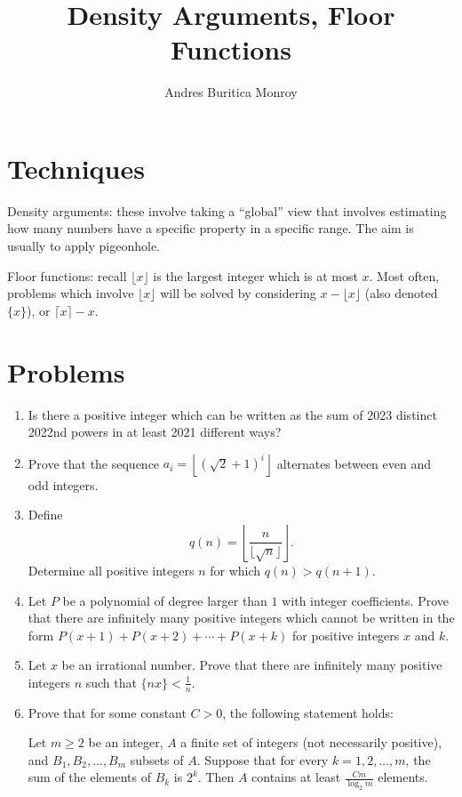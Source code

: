 \documentclass{article}
\title{Density Arguments, Floor Functions}
\author{Andres Buritica Monroy}
\date{}
\begin{document}
\maketitle
\section{Techniques}
  Density arguments: these involve taking a ``global'' view that involves
  estimating how many numbers have a specific property in a specific range.
  The aim is usually to apply pigeonhole.

  Floor functions: recall $\lfloor x\rfloor$ is the largest integer which is at
  most $x$. Most often, problems which involve $\lfloor x\rfloor$ will be
  solved by considering $x-\lfloor x\rfloor$ (also denoted $\{x\}$), or $\lceil
  x\rceil-x$.
\section{Problems}
\begin{enumerate}
  \item Is there a positive integer which can be written as the sum of 2023
    distinct 2022nd powers in at least 2021 different ways?
  \item Prove that the sequence $a_i=\left\lfloor(\sqrt 2+1)^i\right\rfloor$
    alternates between even and odd integers.
  \item Define
    \[q(n)=\left\lfloor\frac n{\lfloor\sqrt n\rfloor}\right\rfloor.\]
    Determine all positive integers $n$ for which $q(n)>q(n+1)$.
  \item Let $P$ be a polynomial of degree larger than $1$ with integer
    coefficients. Prove that there are infinitely many positive integers which cannot be
    written in the form $P(x+1)+P(x+2)+\cdots+P(x+k)$ for positive integers $x$
    and $k$.
  \item Let $x$ be an irrational number. Prove that there are infinitely many
    positive integers $n$ such that $\{nx\}<\frac 1n$.
  \item Prove that for some constant $C>0$, the following statement holds:

    Let $m\ge 2$ be an integer, $A$ a finite set of integers (not
    necessarily positive), and $B_1,B_2,\ldots,B_m$ subsets of $A$. Suppose
    that for every $k=1,2,\ldots,m$, the sum of the elements of $B_k$ is
    $2^k$. Then $A$ contains at least $\frac {Cm}{\log_2 m}$ elements.
\end{enumerate}
\newpage
\end{document}
